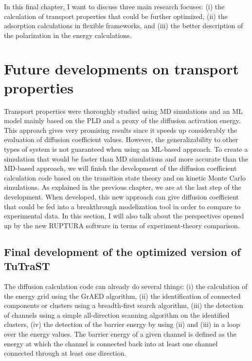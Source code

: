 \documentclass[main]{subfiles}
\begin{document}
In this final chapter, I want to discuss three main research focuses: (i) the calculation of transport properties that could be further optimized, (ii) the adsorption calculations in flexible frameworks, and (iii) the better description of the polarization in the energy calculations.

\section{Future developments on transport properties}

Transport properties were thoroughly studied using MD simulations and an ML model mainly based on the PLD and a proxy of the diffusion activation energy. This approach gives very promising results since it speeds up considerably the evaluation of diffusion coefficient values. However, the generalizability to other types of system is not guaranteed when using an ML-based approach. To create a simulation that would be faster than MD simulations and more accurate than the MD-based approach, we will finish the development of the diffusion coefficient calculation code based on the transition state theory and on kinetic Monte Carlo simulations. As explained in the previous chapter, we are at the last step of the development. When developed, this new approach can give diffusion coefficient that could be fed into a breakthrough modelization tool in order to compare to experimental data. In this section, I will also talk about the perspectives opened up by the new RUPTURA software in terms of experiment-theory comparison.

\subsection{Final development of the optimized version of TuTraST}

The diffusion calculation code can already do several things: (i) the calculation of the energy grid using the GrAED algorithm, (ii) the identification of connected components or clusters using a breadth-first search algorithm, (iii)
the detection of channels using a simple all-direction scanning algorithm on the identified clusters, (iv) the detection of the barrier energy by using (ii) and (iii) in a loop over the energy values. The barrier energy of a given channel is defined as the energy at which the channel is connected back into at least one channel connected through at least one direction. 
\end{document}
